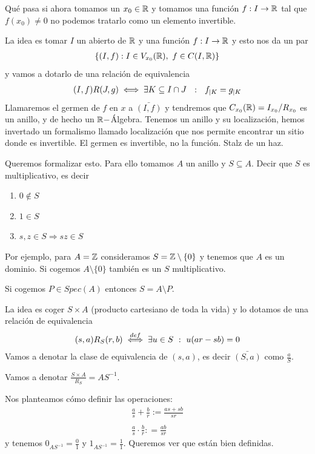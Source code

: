 Qué pasa si ahora tomamos un $x_0\in \mathbb{R}$ y tomamos una función $f:I\to \mathbb{R}$ tal que $f(x_0)\neq 0$ no podemos tratarlo como un elemento invertible.

La idea es tomar $I$ un abierto de $\mathbb{R}$ y una función $f:I\to \mathbb{R}$ y esto nos da un par
\begin{gather*}
    \{(I, f) : I \in V_{x_0}(\mathbb{R}),\ f\in C(I, \mathbb{R})\}
\end{gather*}
y vamos a dotarlo de una relación de equivalencia
\begin{gather*}
    (I,f)R(J,g) \iff \exists K\subseteq I\cap J \ \ : \ \ f_{|K} = g_{|K}
\end{gather*}
Llamaremos el germen de $f$ en $x$ a $\bar{(I,f)}$ y tendremos que $C_{x_0}(\mathbb{R}) = I_{x_0}/R_{x_0}$ es un anillo, y de hecho un $\mathbb{R}-$Álgebra. Tenemos un anillo y su localización, hemos invertado un formalismo llamado localización que nos permite encontrar un sitio donde es invertible. El germen es invertible, no la función. Stalz de un haz.

Queremos formalizar esto. Para ello tomamos $A$ un anillo y $S \subseteq A$. Decir que $S$ es multiplicativo, es decir
\begin{enumerate}
    \item $0\notin S$
    \item $1\in S$
    \item $s,z\in S \Rightarrow sz\in S$
\end{enumerate}

Por ejemplo, para $A=\mathbb{Z}$ consideramos $S=\mathbb{Z}\setminus \{0\}$ y tenemos que $A$ es un dominio. Si cogemos $A\setminus \{0\}$ también es un $S$ multiplicativo.

Si cogemos $P\in Spec(A)$ entonces $S = A\setminus P$.

La idea es coger $S\times A$ (producto cartesiano de toda la vida) y lo dotamos de una relación de equivalencia
\begin{gather*}
    (s,a)R_S(r,b) \overset{def}{\iff} \exists u\in S \ : \ u(ar - sb) = 0
\end{gather*}
Vamos a denotar la clase de equivalencia de $(s,a)$, es decir $\bar{(S,a)}$ como $\frac{a}{S}$.

Vamos a denotar $\frac{S\times A}{R_S} = AS^{-1}$. 

Nos planteamos cómo definir las operaciones:
\begin{gather*}
    \frac{a}{s} + \frac{b}{r} := \frac{as + sb}{sr}\\\\
    \frac{a}{s} \cdot \frac{b}{r} : = \frac{ab}{sr}
\end{gather*}
y tenemos $0_{AS^{-1}} = \frac{0}{1}$ y $1_{AS^{-1}} = \frac{1}{1}$.
Queremos ver que están bien definidas. 

